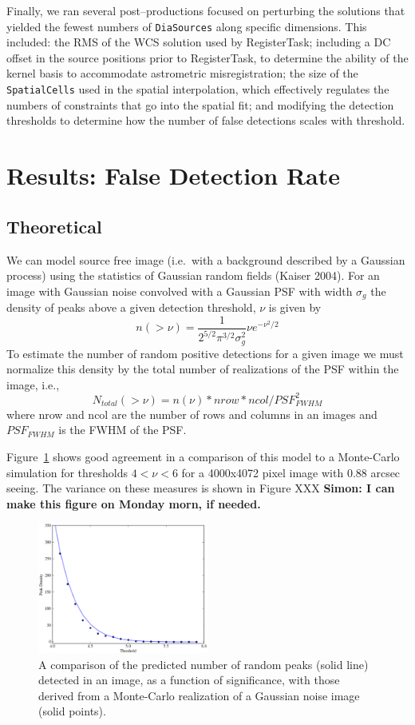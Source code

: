 \documentclass[prd, nofootinbib, floatfix, 11pt,tightenlines,times]{article}
\begin{document}
Finally, we ran several post--productions focused on perturbing the
solutions that yielded the fewest numbers of {\tt DiaSources} along specific
dimensions.  This included: the RMS of the WCS solution used by
RegisterTask; including a DC offset in the source positions prior to
RegisterTask, to determine the ability of the kernel basis to
accommodate astrometric misregistration; the size of the {\tt
  SpatialCells} used in the spatial interpolation, which effectively
regulates the numbers of constraints that go into the spatial fit; and
modifying the detection thresholds to determine how the number of
false detections scales with threshold.


\section{Results: False Detection Rate}

\subsection{Theoretical \label{sec-analyticfp}}

We can model source free image (i.e.\ with a background described by a
Gaussian process) using the statistics of Gaussian random fields
(Kaiser 2004). For an image with Gaussian noise convolved with a
Gaussian PSF with width $\sigma_g$ the density of peaks above a given
detection threshold, $\nu$ is given by 
\begin{equation}
n(>\nu) = \frac{1}{2^{5/2}\pi^{3/2}\sigma_g^{2}} \nu e^{-\nu^2 /2} 
\label{eq-theory}
\end{equation}
 To estimate the number of random
positive detections for a given image we must normalize this density
by the total number of realizations of the PSF within the image, i.e.,
\begin{equation}
N_{total}(>\nu) = n(\nu)*nrow*ncol/PSF_{FWHM}^2
\end{equation}
where nrow and ncol are the number of rows and columns in an images
and $PSF_{FWHM}$ is the FWHM of the PSF. 

Figure~\ref{fig:peaks} shows good agreement in a comparison of this
model to a Monte-Carlo simulation for thresholds $4<\nu<6$ for a
4000x4072 pixel image with 0.88 arcsec seeing. The variance on these
measures is shown in Figure XXX {\bf Simon: I can make this figure on Monday morn, if needed.}
\begin{figure}
\includegraphics[width=0.5\textwidth,
height=0.25\textwidth]{figures/peaks.eps} 
\caption{A comparison of the predicted number of random peaks (solid
  line) detected in an image, as a function of significance, with
  those derived from a Monte-Carlo realization of a Gaussian noise
  image (solid points).}
\label{fig:peaks}
\end{figure}
\end{document}

